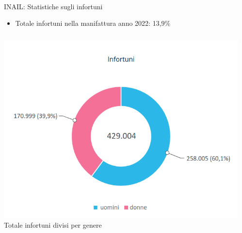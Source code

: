 \documentclass{beamer}
\begin{document}
\begin{frame}{INAIL: Statistiche sugli infortuni}
  \begin{itemize}
  		\item Totale infortuni nella manifattura anno 2022: 13,9\%
  \end{itemize}  	  
  \begin{columns}
    \begin{column}{0.4\textwidth}
      \centering
      \includegraphics[width=\textwidth]{images/totaleinfortuni.png}
      \vspace{2mm}
      \small{Totale infortuni divisi per genere}
    \end{column}
    \begin{column}{0.25\textwidth}
      \centering

\end{column}
\end{columns}
\end{frame}
\end{document}
